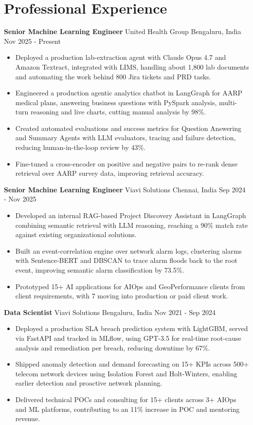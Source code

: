\documentclass[10pt,a4paper]{article}
\newcommand{\role}[4]{\textbf{#1} \textbar{} #2 \hfill #3 \textbar{} #4\par}
\begin{document}
\section{Professional Experience}
\role{Senior Machine Learning Engineer}{United Health Group}{Bengaluru, India}{Nov 2025 - Present}
\begin{itemize}
  \item Deployed a production lab-extraction agent with Claude Opus 4.7 and Amazon Textract, integrated with LIMS, handling about 1,800 lab documents and automating the work behind 800 Jira tickets and PRD tasks.
  \item Engineered a production agentic analytics chatbot in LangGraph for AARP medical plans, answering business questions with PySpark analysis, multi-turn reasoning and live charts, cutting manual analysis by 98\%.
  \item Created automated evaluations and success metrics for Question Answering and Summary Agents with LLM evaluators, tracing and failure detection, reducing human-in-the-loop review by 43\%.
  \item Fine-tuned a cross-encoder on positive and negative pairs to re-rank dense retrieval over AARP survey data, improving retrieval accuracy.
\end{itemize}
\vspace{3pt}
\role{Senior Machine Learning Engineer}{Viavi Solutions}{Chennai, India}{Sep 2024 - Nov 2025}
\begin{itemize}
  \item Developed an internal RAG-based Project Discovery Assistant in LangGraph combining semantic retrieval with LLM reasoning, reaching a 90\% match rate against existing organizational solutions.
  \item Built an event-correlation engine over network alarm logs, clustering alarms with Sentence-BERT and DBSCAN to trace alarm floods back to the root event, improving semantic alarm classification by 73.5\%.
  \item Prototyped 15+ AI applications for AIOps and GeoPerformance clients from client requirements, with 7 moving into production or paid client work.
\end{itemize}
\vspace{3pt}
\role{Data Scientist}{Viavi Solutions}{Bengaluru, India}{Nov 2021 - Sep 2024}
\begin{itemize}
  \item Deployed a production SLA breach prediction system with LightGBM, served via FastAPI and tracked in MLflow, using GPT-3.5 for real-time root-cause analysis and remediation per breach, reducing downtime by 67\%.
  \item Shipped anomaly detection and demand forecasting on 15+ KPIs across 500+ telecom network devices using Isolation Forest and Holt-Winters, enabling earlier detection and proactive network planning.
  \item Delivered technical POCs and consulting for 15+ clients across 3+ AIOps and ML platforms, contributing to an 11\% increase in POC and mentoring revenue.
\end{itemize}
\end{document}
